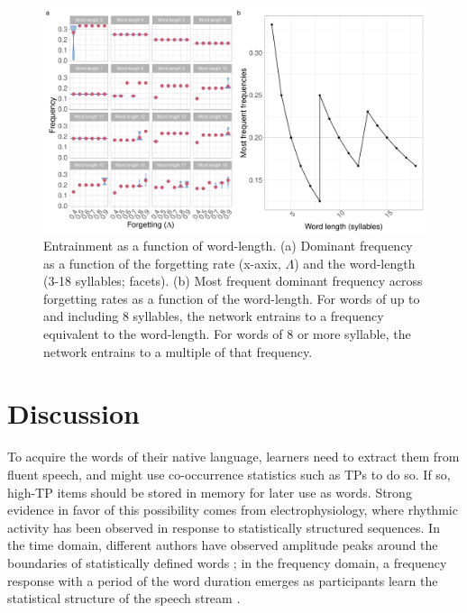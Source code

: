 \documentclass[
]{article}
\begin{document}
\begin{figure}
\includegraphics[width=1\linewidth]{tp_model_entrainment_files/figure-latex/basic-experiment-global-by-n-syll-create-freq-plot-plot-1} \caption{Entrainment as a function of word-length. (a) Dominant frequency as a function of the forgetting rate (x-axix, $\Lambda$) and the word-length (3-18 syllables; facets). (b) Most frequent dominant frequency across forgetting rates as a function of the word-length. For words of up to and including 8 syllables, the network entrains to a frequency equivalent to the word-length. For words of 8 or more syllable, the network entrains to a multiple of that frequency.}\label{fig:basic-experiment-global-by-n-syll-create-freq-plot-plot}
\end{figure}

\clearpage

\hypertarget{discussion}{%
\section{Discussion}\label{discussion}}

To acquire the words of their native language, learners need to extract
them from fluent speech, and might use co-occurrence statistics such as
TPs to do so. If so, high-TP items should be stored in memory for later
use as words. Strong evidence in favor of this possibility comes from
electrophysiology, where rhythmic activity has been observed in response
to statistically structured sequences. In the time domain, different
authors have observed amplitude peaks around the boundaries of
statistically defined words
\citep{Abla2008, Cunillera2006, Kudo2011, Sanders2002, Teinonen2009}; in
the frequency domain, a frequency response with a period of the word
duration emerges as participants learn the statistical structure of the
speech stream
\citep{Buiatti2009, Batterink2017, Flo2022, Kabdebon2015, Moreau2022, Moser2021}.
\end{document}

